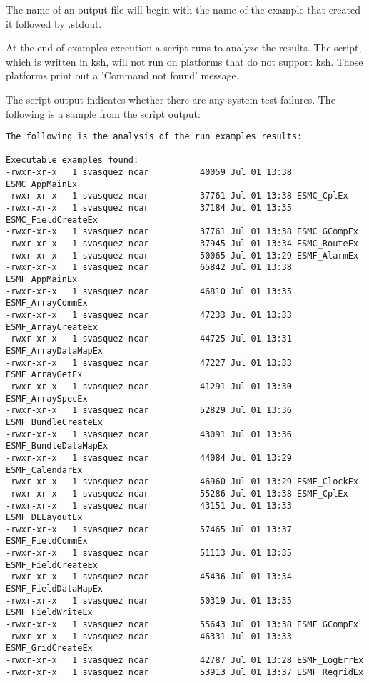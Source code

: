 The name of an output file will begin with the name of the example
that created it followed by .stdout.

At the end of examples execution a script runs to analyze the results.
The script, which is written in ksh, will not run on platforms that do not support
ksh. Those platforms print out a 'Command not found' message.

The script output indicates whether there are any system test failures.
The following is a sample from the script output:

\begin{verbatim}
The following is the analysis of the run examples results:

Executable examples found:
-rwxr-xr-x   1 svasquez ncar          40059 Jul 01 13:38 ESMC_AppMainEx
-rwxr-xr-x   1 svasquez ncar          37761 Jul 01 13:38 ESMC_CplEx
-rwxr-xr-x   1 svasquez ncar          37184 Jul 01 13:35 ESMC_FieldCreateEx
-rwxr-xr-x   1 svasquez ncar          37761 Jul 01 13:38 ESMC_GCompEx
-rwxr-xr-x   1 svasquez ncar          37945 Jul 01 13:34 ESMC_RouteEx
-rwxr-xr-x   1 svasquez ncar          50065 Jul 01 13:29 ESMF_AlarmEx
-rwxr-xr-x   1 svasquez ncar          65842 Jul 01 13:38 ESMF_AppMainEx
-rwxr-xr-x   1 svasquez ncar          46810 Jul 01 13:35 ESMF_ArrayCommEx
-rwxr-xr-x   1 svasquez ncar          47233 Jul 01 13:33 ESMF_ArrayCreateEx
-rwxr-xr-x   1 svasquez ncar          44725 Jul 01 13:31 ESMF_ArrayDataMapEx
-rwxr-xr-x   1 svasquez ncar          47227 Jul 01 13:33 ESMF_ArrayGetEx
-rwxr-xr-x   1 svasquez ncar          41291 Jul 01 13:30 ESMF_ArraySpecEx
-rwxr-xr-x   1 svasquez ncar          52829 Jul 01 13:36 ESMF_BundleCreateEx
-rwxr-xr-x   1 svasquez ncar          43091 Jul 01 13:36 ESMF_BundleDataMapEx
-rwxr-xr-x   1 svasquez ncar          44084 Jul 01 13:29 ESMF_CalendarEx
-rwxr-xr-x   1 svasquez ncar          46960 Jul 01 13:29 ESMF_ClockEx
-rwxr-xr-x   1 svasquez ncar          55286 Jul 01 13:38 ESMF_CplEx
-rwxr-xr-x   1 svasquez ncar          43151 Jul 01 13:33 ESMF_DELayoutEx
-rwxr-xr-x   1 svasquez ncar          57465 Jul 01 13:37 ESMF_FieldCommEx
-rwxr-xr-x   1 svasquez ncar          51113 Jul 01 13:35 ESMF_FieldCreateEx
-rwxr-xr-x   1 svasquez ncar          45436 Jul 01 13:34 ESMF_FieldDataMapEx
-rwxr-xr-x   1 svasquez ncar          50319 Jul 01 13:35 ESMF_FieldWriteEx
-rwxr-xr-x   1 svasquez ncar          55643 Jul 01 13:38 ESMF_GCompEx
-rwxr-xr-x   1 svasquez ncar          46331 Jul 01 13:33 ESMF_GridCreateEx
-rwxr-xr-x   1 svasquez ncar          42787 Jul 01 13:28 ESMF_LogErrEx
-rwxr-xr-x   1 svasquez ncar          53913 Jul 01 13:37 ESMF_RegridEx

\end{verbatim}
